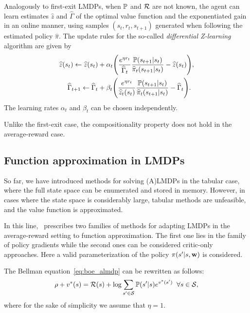 Analogously to first-exit LMDPs, when $\mathbb{P}$ and $\mathcal{R}$ are not known, the agent can learn estimates $\widehat z$ and $\widehat\Gamma$ of the optimal value function and the exponentiated gain in an online manner, using samples $(s_t, r_t, s_{t+1})$ generated when following the estimated policy $\widehat\pi$. The update rules for the so-called \textit{differential Z-learning} algorithm are given by 
\begin{align}
  \widehat{z}(s_t)  \gets \widehat{z}(s_{t}) & + \alpha_t \Bigg(\frac{e^{\eta r_t}}{\widehat\Gamma_t}\dfrac{\kernel(s_{t+1}\lvert s_t)}{\widehat\pi_t(s_{t+1}\lvert s_t)}  - \widehat z(s_t)\Bigg),\label{eq:diff_update_z}  \\   %
  \widehat\Gamma_{t+1}    \gets \widehat\Gamma_t       & + \beta_t \Bigg(\frac{e^{\eta r_t}}{\widehat z_t(s_t)}\dfrac{\kernel(s_{t+1}\lvert s_t)}{\widehat\pi_t(s_{t+1}\lvert s_t)}  - \widehat \Gamma_t\Bigg).\label{eq:diff_update_gamma}
\end{align}
The learning rates $\alpha_t$ and $\beta_t$ can be chosen independently.

Unlike the first-exit case, the compositionality property does not hold in the average-reward case.

\subsection{Function approximation in LMDPs}

So far, we have introduced methods for solving (A)LMDPs in the tabular case, where the full state space can be enumerated and stored in memory. However, in cases where the state space is considerably large, tabular methods are unfeasible, and the value function is approximated.

In this line,~\citet{Todorov2010} prescribes two families of methods for adapting LMDPs in the average-reward setting to function approximation. The first one lies in the family of policy gradients while the second ones can be considered critic-only approaches. Here a valid parameterization of the policy $\pi(s'\lvert s, \mathbf{w})$ is considered.

The Bellman equation~\eqref{eq:boe_almdp} can be rewritten as follows:
\begin{equation}
\label{eq:boe_for_pg}
\rho + v^*(s) =\mathcal{R}(s) +\log{\sum_{s'\in\mathcal{S}}\mathbb{P}(s'\lvert s)e^{v^*(s')}} \;\;\forall s\in\mathcal{S},
\end{equation}
where for the sake of simplicity we assume that $\eta=1$. 

